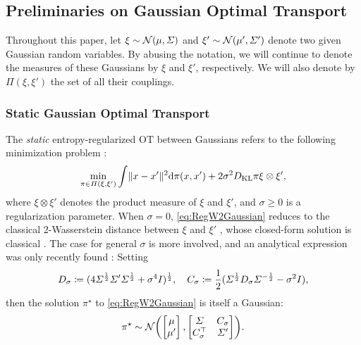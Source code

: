 \subsection{Preliminaries on Gaussian Optimal Transport}
\label{sec:prelim}

Throughout this paper, let $\xi \sim \mathcal{N}(\mu, \Sigma)$ and $\xi' \sim \mathcal{N}(\mu', \Sigma')$ denote two given Gaussian random variables. By abusing the notation, we will continue to denote the measures of these Gaussians by $\xi$ and $\xi'$, respectively. We will also denote by $\Pi(\xi,\xi')$ the set of all their couplings. 


\subsubsection{Static Gaussian Optimal Transport}
\label{sec:staticGOT}
The \emph{static} entropy-regularized \acrshort{OT} between Gaussians refers to the following minimization problem \citep{peyre2019computational}:
\begin{equation}
\label{eq:RegW2Gaussian}
\min_{\pi \in \Pi(\xi, \xi')} \int  \lVert x-x'\rVert^2  \mathrm{d} \pi(x, x') + 2\sigma^2 D_{\mathrm{KL}}{\pi}{ \xi \otimes \xi'  },
\end{equation}where $\xi\otimes\xi'$ denotes the product measure of $\xi$ and $\xi'$, and $\sigma \geq 0$ is a regularization parameter. When $\sigma = 0$, \eqref{eq:RegW2Gaussian} reduces to the classical 2-Wasserstein distance between $\xi$ and $\xi'$ \citep{villani2009optimal}, whose closed-form solution is classical \citep{dowson1982frechet, olkin1982distance}. The case for general $\sigma$ is more involved, and an analytical expression was only recently found \citep{bojilov2016matching, del2020statistical, janati2020entropic, mallasto2021entropy}: Setting%
\begin{equation}
\label{eq:Cstar}
D_\sigma \coloneqq ( 4\Sigma^{\frac{1}{2}} \Sigma' \Sigma^{\frac{1}{2}} +  \sigma^4I  )^{\frac{1}{2}},\quad C_\sigma \coloneqq \frac{1}{2}(\Sigma^{\frac{1}{2}} D_\sigma \Sigma^{-\frac{1}{2}} - \sigma^2I),
\end{equation}
then the solution $\pi^\star$ to \eqref{eq:RegW2Gaussian} is itself a Gaussian:
\begin{align}
\label{eq:StaticGaussianSB-sol}
\pi^\star \sim \Ncal \parens*{  \begin{bmatrix}
\mu \\
\mu'
\end{bmatrix},  \begin{bmatrix}
\Sigma&C_\sigma\\
C_\sigma^\top&\Sigma'
\end{bmatrix}}.
\end{align}

